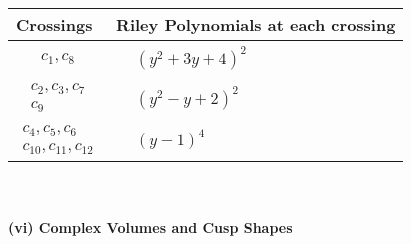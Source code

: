 \documentclass[1p]{elsarticle_modified}
\theoremstyle{definition}
\begin{document}
\begin{tabular}{m{50pt}|m{274pt}}
Crossings & \hspace{64pt}Riley Polynomials at each crossing \\
\hline $$\begin{aligned}c_{1},c_{8}\end{aligned}$$&$\begin{aligned}
&(y^2+3 y+4)^2
\end{aligned}$\\
\hline $$\begin{aligned}c_{2},c_{3},c_{7}\\c_{9}\end{aligned}$$&$\begin{aligned}
&(y^2- y+2)^2
\end{aligned}$\\
\hline $$\begin{aligned}c_{4},c_{5},c_{6}\\c_{10},c_{11},c_{12}\end{aligned}$$&$\begin{aligned}
&(y-1)^4
\end{aligned}$\\
\hline
\end{tabular}\\~\\
\newpage\flushleft \textbf{(vi) Complex Volumes and Cusp Shapes}
\end{document}

